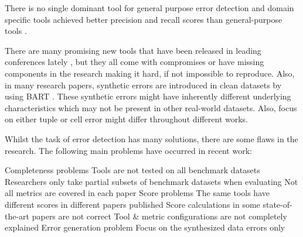 There is no single dominant tool for general purpose error detection and domain specific tools achieved better precision and recall scores than general-purpose tools \cite{Abedjan2016-jc}.

There are many promising new tools that have been released in leading conferences lately \cite{Mahdavi2019-zf,Heidari2019-ox,Neutatz2019-aw,Visengeriyeva2018-qz,Mahdavi2019-pk,Wang2019-jg}, but they all come with compromises or have missing components in the research making it hard, if not impossible to reproduce.
Also, in many research papers, synthetic errors are introduced in clean datasets by using BART \cite{Arocena2015-om}. These synthetic errors might have inherently different underlying characteristics which may not be present in other real-world datasets. Also, focus on either tuple or cell error might differ throughout different works.

Whilst the task of error detection has many solutions, there are some flaws in the research. The following main problems have occurred in recent work:
\begin{outline}
    \1 Completeness problems
        \2 Tools are not tested on all benchmark datasets
        \2 Researchers only take partial subsets of benchmark datasets when evaluating
        \2 Not all metrics are covered in each paper
    \1 Score problems
        \2 The same tools have different scores in different papers published
        \2 Score calculations in some state-of-the-art papers are not correct
        \2 Tool \& metric configurations are not completely explained
    \1 Error generation problem
        \2 Focus on the synthesized data errors only
\end{outline}


